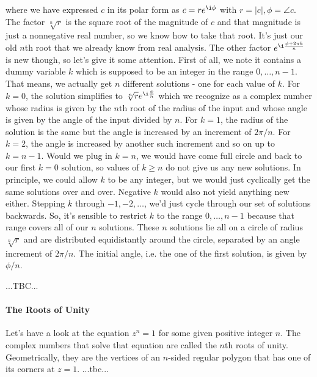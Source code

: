 where we have expressed $c$ in its polar form as $c = r e^{\i \phi}$ with $r = |c|, \phi = \angle c$. The factor $\sqrt[n]{r}$ is the square root of the magnitude of $c$ and that magnitude is just a nonnegative real number, so we know how to take that root. It's just our old $n$th root that we already know from real analysis. The other factor $e^{\i \frac{\phi + 2 \pi k}{n}}$ is new though, so let's give it some attention. First of all, we note it contains a dummy variable $k$ which is supposed to be an integer in the range $0,\ldots,n-1$. That means, we actually get $n$ different solutions - one for each value of $k$. For $k = 0$, the solution simplifies to $\sqrt[n]{r} e^{\i \frac{\phi}{n}}$ which we recognize as a complex number whose radius is given by the $n$th root of the radius of the input and whose angle is given by the angle of the input divided by $n$. For $k=1$, the radius of the solution is the same but the angle is increased by an increment of $2\pi / n$. For $k=2$, the angle is increased by another such increment and so on up to $k=n-1$. Would we plug in $k=n$, we would have come full circle and back to our first $k=0$ solution, so values of $k \geq n$ do not give us any new solutions. In principle, we could allow $k$ to be any integer, but we would just cyclically get the same solutions over and over. Negative $k$ would also not yield anything new either. Stepping $k$ through $-1,-2,\ldots$, we'd just cycle through our set of solutions backwards. So, it's sensible to restrict $k$ to the range $0,\ldots,n-1$ because that range covers all of our $n$ solutions. These $n$ solutions lie all on a circle of radius $\sqrt[n]{r}$ and are distributed equidistantly around the circle, separated by an angle increment of $2 \pi / n$. The initial angle, i.e. the one of the first solution, is given by $\phi / n$.

\medskip


%
...TBC...

\paragraph{The Roots of Unity}
Let's have a look at the equation $z^n = 1$ for some given positive integer $n$. The complex numbers that solve that equation are called the $n$th roots of unity. Geometrically, they are the vertices of an $n$-sided regular polygon that has one of its corners at $z = 1$. ...tbc...






